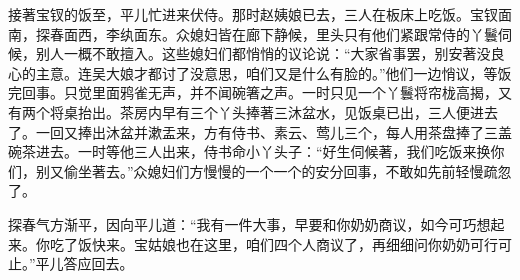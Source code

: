 \begin{parag}


    接著宝钗的饭至，平儿忙进来伏侍。那时赵姨娘已去，三人在板床上吃饭。宝钗面南，探春面西，李纨面东。众媳妇皆在廊下静候，里头只有他们紧跟常侍的丫鬟伺候，别人一概不敢擅入。这些媳妇们都悄悄的议论说：“大家省事罢，别安著没良心的主意。连吴大娘才都讨了没意思，咱们又是什么有脸的。”他们一边悄议，等饭完回事。只觉里面鸦雀无声，并不闻碗箸之声。一时只见一个丫鬟将帘栊高揭，又有两个将桌抬出。茶房内早有三个丫头捧著三沐盆水，见饭桌已出，三人便进去了。一回又捧出沐盆并漱盂来，方有侍书、素云、莺儿三个，每人用茶盘捧了三盖碗茶进去。一时等他三人出来，侍书命小丫头子：“好生伺候著，我们吃饭来换你们，别又偷坐著去。”众媳妇们方慢慢的一个一个的安分回事，不敢如先前轻慢疏忽了。
\end{parag}


\begin{parag}


    探春气方渐平，因向平儿道：“我有一件大事，早要和你奶奶商议，如今可巧想起来。你吃了饭快来。宝姑娘也在这里，咱们四个人商议了，再细细问你奶奶可行可止。”平儿答应回去。
\end{parag}


